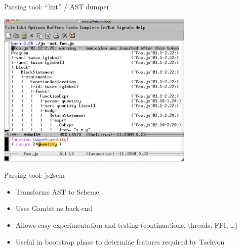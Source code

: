 \begin{frame}{Parsing tool: “lint” / AST dumper}
\begin{center}
\vspace{-5mm}%
\includegraphics[height=3in]{images/astdump}
\end{center}
\end{frame}

\begin{frame}{Parsing tool: js2scm}
    \begin{itemize}
        \item Transforms AST to Scheme
        \item Uses Gambit as back-end
        \item Allows easy experimentation and testing (continuations, threads,
        FFI, \ldots)
        \item Useful in bootstrap phase to determine features required by Tachyon
    \end{itemize}
\end{frame}

